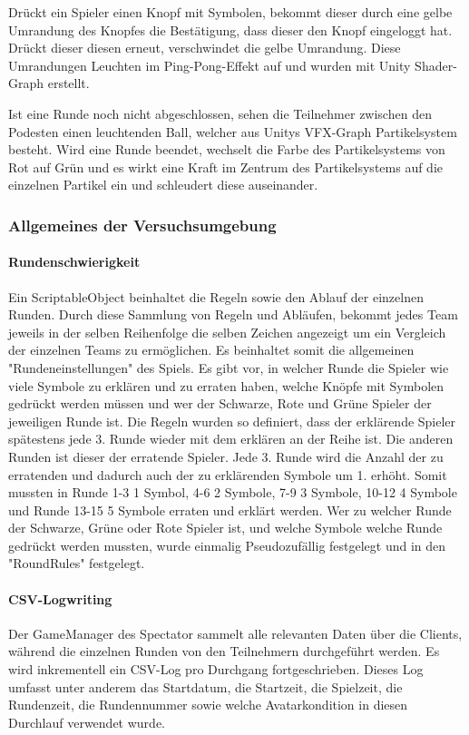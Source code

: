 \documentclass[a4paper,11pt]{article}%
\renewcommand{\\}{\vspace*{0.5\baselineskip} \newline}
\begin{document}
Drückt ein Spieler einen Knopf mit Symbolen, bekommt dieser durch eine gelbe Umrandung des Knopfes die Bestätigung, dass dieser den Knopf eingeloggt hat. Drückt dieser diesen erneut, verschwindet die gelbe Umrandung. Diese Umrandungen Leuchten im Ping-Pong-Effekt auf und wurden mit Unity Shader-Graph erstellt.

Ist eine Runde noch nicht abgeschlossen, sehen die Teilnehmer zwischen den Podesten einen leuchtenden Ball, welcher aus Unitys VFX-Graph Partikelsystem besteht. Wird eine Runde beendet, wechselt die Farbe des Partikelsystems von Rot auf Grün und es wirkt eine Kraft im Zentrum des Partikelsystems auf die einzelnen Partikel ein und schleudert diese auseinander.

\subsubsection{Allgemeines der Versuchsumgebung}

\paragraph{Rundenschwierigkeit}
Ein ScriptableObject beinhaltet die Regeln sowie den Ablauf der einzelnen Runden. 
Durch diese Sammlung von Regeln und Abläufen, bekommt jedes Team jeweils in der selben Reihenfolge die selben Zeichen angezeigt um ein Vergleich der einzelnen Teams zu ermöglichen. Es beinhaltet somit die allgemeinen "Rundeneinstellungen" des Spiels. Es gibt vor, in welcher Runde die Spieler wie viele Symbole zu erklären und zu erraten haben, welche Knöpfe mit Symbolen gedrückt werden müssen und wer der Schwarze, Rote und Grüne Spieler der jeweiligen Runde ist. Die Regeln wurden so definiert, dass der erklärende Spieler spätestens jede 3. Runde wieder mit dem erklären an der Reihe ist. Die anderen Runden ist dieser der erratende Spieler. Jede 3. Runde wird die Anzahl der zu erratenden und dadurch auch der zu erklärenden Symbole um 1. erhöht. Somit mussten in Runde 1-3 1 Symbol, 4-6 2 Symbole, 7-9 3 Symbole, 10-12 4 Symbole und Runde 13-15 5 Symbole erraten und erklärt werden.
Wer zu welcher Runde der Schwarze, Grüne oder Rote Spieler ist, und welche Symbole welche Runde gedrückt werden mussten, wurde einmalig Pseudozufällig festgelegt und in den "RoundRules" festgelegt.

\paragraph{CSV-Logwriting}
Der GameManager des Spectator sammelt alle relevanten Daten über die Clients, während die einzelnen Runden von den Teilnehmern durchgeführt werden. Es wird inkrementell ein CSV-Log pro Durchgang fortgeschrieben. Dieses Log umfasst unter anderem das Startdatum, die Startzeit, die Spielzeit, die Rundenzeit, die Rundennummer %
sowie welche Avatarkondition in diesen Durchlauf verwendet wurde.
\end{document}
